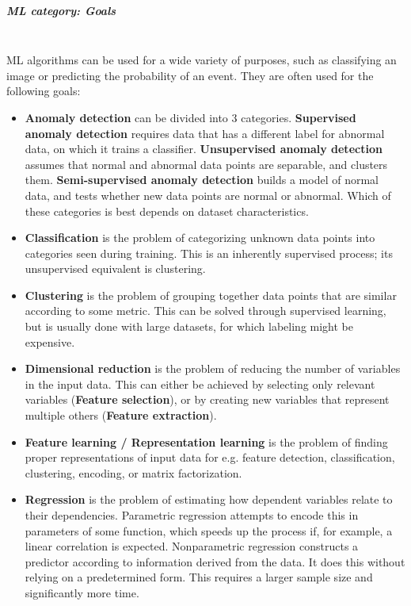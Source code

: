 \subparagraph{ML category: Goals}\mbox{}\\
ML algorithms can be used for a wide variety of purposes, such as classifying an image or predicting the probability of an event. They are often used for the following goals: \cite{Kwon2017}
\begin{itemize}
	\item \textbf{Anomaly detection}
		can be divided into 3 categories. \textbf{Supervised anomaly detection} requires data that has a different label for abnormal data, on which it trains a classifier. \textbf{Unsupervised anomaly detection} assumes that normal and abnormal data points are separable, and clusters them. \textbf{Semi-supervised anomaly detection} builds a model of normal data, and tests whether new data points are normal or abnormal. Which of these categories is best depends on dataset characteristics.
	\item \textbf{Classification}
		is the problem of categorizing unknown data points into categories seen during training. This is an inherently supervised process; its unsupervised equivalent is clustering.
	\item \textbf{Clustering}
		is the problem of grouping together data points that are similar according to some metric. This can be solved through supervised learning, but is usually done with large datasets, for which labeling might be expensive.
	\item \textbf{Dimensional reduction}
		is the problem of reducing the number of variables in the input data. This can either be achieved by selecting only relevant variables (\textbf{Feature selection}), or by creating new variables that represent multiple others (\textbf{Feature extraction}).
	\item \textbf{Feature learning / Representation learning}
		is the problem of finding proper representations of input data for e.g. feature detection, classification, clustering, encoding, or matrix factorization.
	\item \textbf{Regression}
		is the problem of estimating how dependent variables relate to their dependencies. Parametric regression attempts to encode this in parameters of some function, which speeds up the process if, for example, a linear correlation is expected. Nonparametric regression constructs a predictor according to information derived from the data. It does this without relying on a predetermined form. This requires a larger sample size and significantly more time.
\end{itemize}


